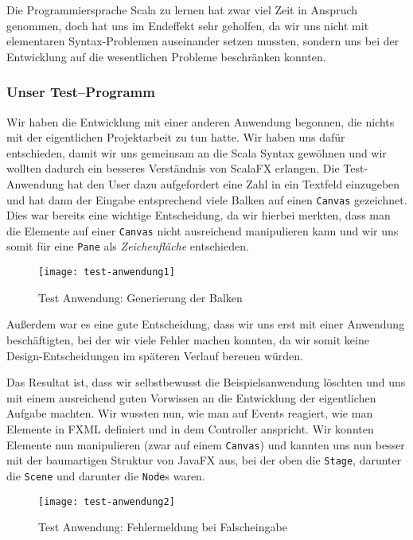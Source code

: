 Die Programmiersprache Scala zu lernen hat zwar viel Zeit in Anspruch genommen, doch hat uns im Endeffekt sehr geholfen, da wir uns nicht mit elementaren Syntax-Problemen auseinander setzen mussten, sondern uns bei der Entwicklung auf die wesentlichen Probleme beschränken konnten.

\subsubsection{Unser Test--Programm}
Wir haben die Entwicklung mit einer anderen Anwendung begonnen, die nichts mit der eigentlichen Projektarbeit zu tun hatte. Wir haben uns dafür entschieden, damit wir uns gemeinsam an die Scala Syntax gewöhnen und wir wollten dadurch ein besseres Verständnis von ScalaFX erlangen. Die Test-Anwendung hat den User dazu aufgefordert eine Zahl in ein Textfeld einzugeben und hat dann der Eingabe entsprechend viele Balken auf einen \texttt{Canvas} gezeichnet. Dies war bereits eine wichtige Entscheidung, da wir hierbei merkten, dass man die Elemente auf einer \texttt{Canvas} nicht ausreichend manipulieren kann und wir uns somit für eine \texttt{Pane} als \textit{Zeichenfläche} entschieden.

\begin{figure}[!htb]
    \centering
      \texttt{[image: test-anwendung1]}
    \caption{Test Anwendung: Generierung der Balken}
\end{figure}

Außerdem war es eine gute Entscheidung, dass wir uns erst mit einer Anwendung beschäftigten, bei der wir viele Fehler machen konnten, da wir somit keine Design-Entscheidungen im späteren Verlauf bereuen würden.

Das Resultat ist, dass wir selbstbewusst die Beispielsanwendung löschten und uns mit einem ausreichend guten Vorwissen an die Entwicklung der eigentlichen Aufgabe machten. Wir wussten nun, wie man auf Events reagiert, wie man Elemente in FXML definiert und in dem Controller anspricht. Wir konnten Elemente nun manipulieren (zwar auf einem \texttt{Canvas}) und kannten uns nun besser mit der baumartigen Struktur von JavaFX aus, bei der oben die \texttt{Stage}, darunter die \texttt{Scene} und darunter die \texttt{Node}s waren.

\begin{figure}[!htb]
    \centering
      \texttt{[image: test-anwendung2]}
    \caption{Test Anwendung: Fehlermeldung bei Falscheingabe}
\end{figure}

